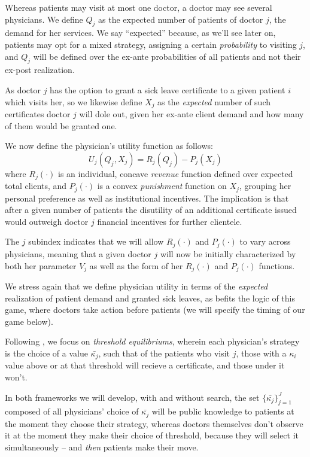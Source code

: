 \documentclass{article}
\begin{document}
Whereas patients may visit at most one doctor, a doctor may see several physicians. We define $Q_j$ as the expected number of patients of doctor $j$, the demand for her services. We say ``expected'' because, as we'll see later on, patients may opt for a mixed strategy, assigning a certain \textit{probability} to visiting $j$, and $Q_j$ will be defined over the ex-ante probabilities of all patients and not their ex-post realization.

As doctor $j$ has the option to grant a sick leave certificate to a given patient $i$ which visits her, so we likewise define $X_j$ as the \textit{expected} number of such certificates doctor $j$ will dole out, given her ex-ante client demand and how many of them would be granted one.

We now define the physician's utility function as follows:
\[
U_j(Q_j, X_j) = R_j(Q_j) - P_j(X_j)
\]
where $R_j(\cdot)$ is an individual, concave \textit{revenue} function defined over expected total clients, and $P_j(\cdot)$ is a convex \textit{punishment} function on $X_j$, grouping her personal preference as well as institutional incentives. The implication is that after a given number of patients the disutility of an additional certificate issued would outweigh doctor $j$ financial incentives for further clientele.

The $j$ subindex indicates that we will allow $R_j(\cdot)$ and $P_j(\cdot)$ to vary across physicians, meaning that a given doctor $j$ will now be initially characterized by both her parameter $V_j$ as well as the form of her $R_j(\cdot)$ and $P_j(\cdot)$ functions.

We stress again that we define physician utility in terms of the \textit{expected} realization of patient demand and granted sick leaves, as befits the logic of this game, where doctors take action before patients (we will specify the timing of our game below).

Following \cite{schnell2017physician}, we focus on \textit{threshold equilibriums}, wherein each physician’s strategy is the choice of a value $\bar{\kappa_j}$, such that of the patients who visit $j$, those with a $\kappa_i$ value above or at that threshold will recieve a certificate, and those under it won’t.

In both frameworks we will develop, with and without search, the set $\{\bar{\kappa_j}\}_{j =1}^{J}$ composed of all physicians’ choice of $\bar{\kappa_j}$ will be public knowledge to patients at the moment they choose their strategy, whereas doctors themselves don’t observe it at the moment they make their choice of threshold, because they will select it simultaneously -- and \textit{then} patients make their move.
\end{document}
